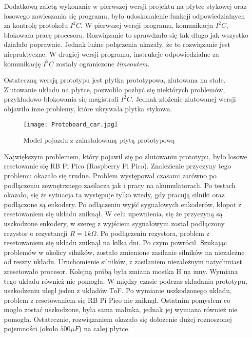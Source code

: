         Dodatkową zaletą wykonanie w pierwszej wersji projektu na płytce stykowej oraz losowego zawieszania się programu, było udoskonalenie funkcji odpowiedzialnych za kontrolę protokołu $I^2C$.
        W pierwszej wersji programu, komunikacja $I^2C$, blokowała pracę procesora.
        Rozwiązanie to sprawdzało się tak długo jak wszystko działało poprawnie.
        Jednak luźne połączenia ukazały, że to rozwiązanie jest niepraktyczne.
        W drugiej wersji programu, instrukcje odpowiedzialne za komunikację $I^2C$ zostały ograniczone \textit{timeoutem}.

        Ostateczną wersją prototypu jest płytka prototypowa, zlutowana na stałe.
        Zlutowanie układu na płytce, pozwoliło pozbyć się niektórych problemów, przykładowo blokowania się magistrali $I^2C$.
        Jednak złożenie zlutowanej wersji objawiło inne problemy, które ukrywała płytka stykowa.
        \begin{figure}[!ht]
            \centering
            \texttt{[image: Protoboard\_car.jpg]}
            \caption{Model pojazdu z zainstalowaną płytą prototypową}
            \label{fig:protoboard_car}
        \end{figure}
        
        Największym problemem, który pojawił się po zlutowaniu prototypu, było losowe resetowanie się RB Pi Pico (Raspberry Pi Pico).
        Znalezienie przyczyny tego problemu okazało się trudne.
        Problem występował czasami zarówno po podłączeniu zewnętrznego zasilacza jak i pracy na akumulatorach.
        Po testach okazało, się że sytuacja ta występuje tylko wtedy, gdy pracują silniki oraz podłączone są enkodery.
        Po odłączeniu wyjść sygnałowych enkoderów, kłopot z resetowaniem się układu zniknął.
        W celu upewnienia, się że przyczyną są uszkodzone enkodery, w szereg z wyjściem sygnałowym został podłączony rezystor o rezystancji $R =1k\Omega$.
        Po podłączeniu rezystora, problem z resetowaniem się układu zniknął na kilka dni.
        Po czym powrócił. Szukając problemów w okolicy silników, zostało zmienione zasilanie silników na niezależne od reszty układu.
        Uruchomienie silników, z zasilaniem niezależnym natychmiast zresetowało procesor.
        Kolejną próbą była zmiana mostka H na inny. Wymiana tego układu również nie pomogła.
        W między czasie podczas składania prototypu, uszkodzeniu uległ jeden z układów ToF. 
        Po wymianie uszkodzonego układu, problem z resetowaniem się RB Pi Pico nie zniknął.
        Ostatnim pomysłem co mogło zostać uszkodzone, była sama malinka, jednak jej wymiana również nie pomogła.
        Ostatecznie, rozwiązaniem okazało się dołożenie dużej roznoszonej pojemności (około $500\mu F$) na całej płytce.

